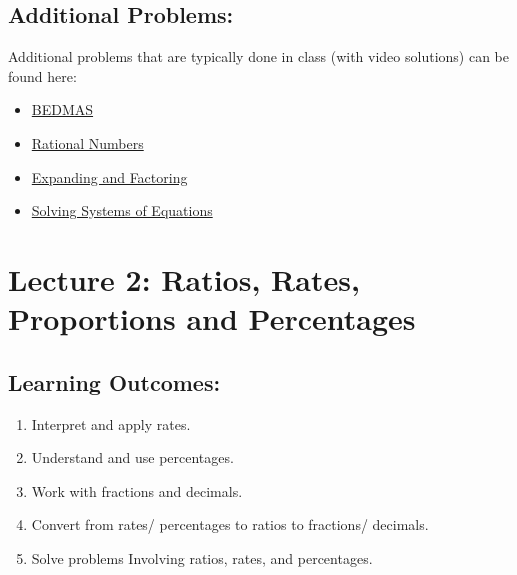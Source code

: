 \documentclass[
]{book}
\providecommand{\tightlist}{%
  \setlength{\itemsep}{0pt}\setlength{\parskip}{0pt}}
\begin{document}
\subsection*{Additional Problems:}\label{additional-problems}

Additional problems that are typically done in class (with video solutions) can be found here:

\begin{itemize}
\item
  \href{https://theelementsmath.github.io/M114/preliminaries.html\#order-of-operations}{BEDMAS}
\item
  \href{https://theelementsmath.github.io/M114/preliminaries.html\#rational-numbers}{Rational Numbers}
\item
  \href{https://theelementsmath.github.io/M114/preliminaries.html\#expanding-and-factoring}{Expanding and Factoring}
\item
  \href{https://theelementsmath.github.io/M114/preliminaries.html\#solving-systems-of-equations}{Solving Systems of Equations}
\end{itemize}

\section*{Lecture 2: Ratios, Rates, Proportions and Percentages}\label{lecture-2-ratios-rates-proportions-and-percentages}

\subsection*{Learning Outcomes:}\label{learning-outcomes-1}

\begin{enumerate}
\def\labelenumi{\arabic{enumi}.}
\tightlist
\item
  Interpret and apply rates.
\item
  Understand and use percentages.
\item
  Work with fractions and decimals.
\item
  Convert from rates/ percentages to ratios to fractions/ decimals.
\item
  Solve problems Involving ratios, rates, and percentages.
\end{enumerate}
\end{document}
